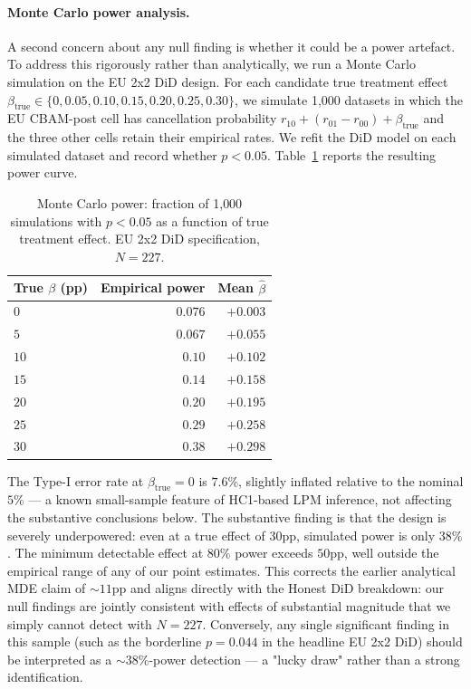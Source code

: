 \documentclass[11pt,a4paper]{article}
\begin{document}
\paragraph{Monte Carlo power analysis.} A second concern about any null finding is whether it could be a power artefact. To address this rigorously rather than analytically, we run a Monte Carlo simulation on the EU 2x2 DiD design. For each candidate true treatment effect $\beta_{\text{true}} \in \{0, 0.05, 0.10, 0.15, 0.20, 0.25, 0.30\}$, we simulate 1{,}000 datasets in which the EU CBAM-post cell has cancellation probability $r_{10} + (r_{01} - r_{00}) + \beta_{\text{true}}$ and the three other cells retain their empirical rates. We refit the DiD model on each simulated dataset and record whether $p < 0.05$. Table~\ref{tab:ch8-mc-power} reports the resulting power curve.

\begin{table}[ht]
\centering
\caption{Monte Carlo power: fraction of 1{,}000 simulations with $p < 0.05$ as a function of true treatment effect. EU 2x2 DiD specification, $N = 227$.}
\label{tab:ch8-mc-power}
\begin{tabular}{lrr}
\toprule
True $\beta$ (pp) & Empirical power & Mean $\hat\beta$ \\
\midrule
$0$  & $0.076$ & $+0.003$ \\
$5$  & $0.067$ & $+0.055$ \\
$10$ & $0.10$  & $+0.102$ \\
$15$ & $0.14$  & $+0.158$ \\
$20$ & $0.20$  & $+0.195$ \\
$25$ & $0.29$  & $+0.258$ \\
$30$ & $0.38$  & $+0.298$ \\
\bottomrule
\end{tabular}
\end{table}

The Type-I error rate at $\beta_{\text{true}} = 0$ is $7.6\%$, slightly inflated relative to the nominal $5\%$ — a known small-sample feature of HC1-based LPM inference, not affecting the substantive conclusions below. The substantive finding is that the design is severely underpowered: even at a true effect of $30$pp, simulated power is only $38\%$. The minimum detectable effect at $80\%$ power exceeds $50$pp, well outside the empirical range of any of our point estimates. This corrects the earlier analytical MDE claim of $\sim 11$pp and aligns directly with the Honest DiD breakdown: our null findings are jointly consistent with effects of substantial magnitude that we simply cannot detect with $N = 227$. Conversely, any single significant finding in this sample (such as the borderline $p = 0.044$ in the headline EU 2x2 DiD) should be interpreted as a $\sim 38\%$-power detection — a "lucky draw" rather than a strong identification.
\end{document}
